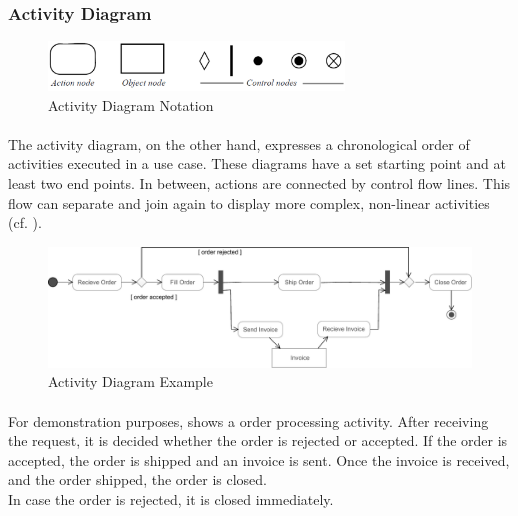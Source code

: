 \subsubsection{Activity Diagram}

\begin{figure}[H]
    \centering
    \includegraphics[width=0.7\textwidth]{img/ActivitySymbols.pdf}
    \caption[Activity Diagram Notation]{Activity Diagram Notation \parencite{ObjectManagementGroup.01.03.2015}}\label{fig:adSymb}
\end{figure}

\paragraph{} The activity diagram, on the other hand, expresses a chronological order of activities executed in a use case. These diagrams have a set starting point and at least two end points. In between, actions are connected by control flow lines. This flow can separate and join again to display more complex, non-linear activities  (cf. ).

\begin{figure}[H]
    \centering
    \includegraphics[width=\textwidth]{img/ActivityExample.pdf}
    \caption[Activity Diagram Example]{Activity Diagram Example \parencite[380]{ObjectManagementGroup.01.03.2015}}\label{fig:adEx}
\end{figure}

\paragraph{} For demonstration purposes,  shows a order processing activity. After receiving the request, it is decided whether the order is rejected or accepted. If the order is accepted, the order is shipped and an invoice is sent. Once the invoice is received, and the order shipped, the order is closed. \\
In case the order is rejected, it is closed immediately. 

